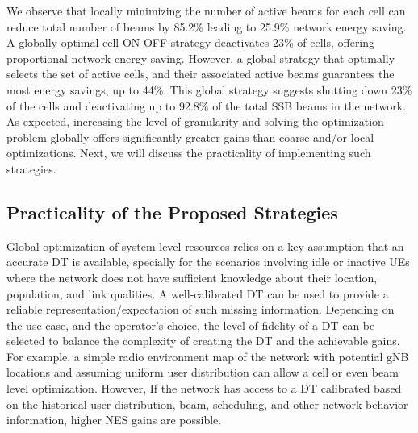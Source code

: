 We observe that locally minimizing the number of active beams for each cell can reduce total number of beams by 85.2\% %
leading to 25.9\% network energy saving.
A globally optimal cell ON-OFF strategy deactivates 23\% of cells, offering proportional network energy saving. 
However, a global strategy that optimally selects the set of active cells, and their associated active beams guarantees the most energy savings, up to 44\%. This global strategy suggests
shutting down 23\% of the cells and deactivating up to 92.8\% of the total SSB beams in the network.
As expected, increasing the level of granularity and solving the optimization problem globally offers significantly greater gains than coarse and/or local optimizations. Next, we will discuss the practicality of implementing such strategies. 


\subsection{Practicality of the Proposed Strategies}
Global optimization of system-level resources relies on a key assumption that an accurate DT is available, specially for the scenarios involving idle or inactive UEs where the network does not have sufficient knowledge about their location, population, and link qualities. A well-calibrated DT can be used to provide a reliable representation/expectation of such missing information.  
Depending on the use-case, and the operator's choice, the level of fidelity of a DT can be selected to balance the complexity of creating the DT and the achievable gains. 
For example, a simple radio environment map of the network with potential gNB locations and assuming uniform user distribution can allow a cell or even beam level optimization. However, If the network has access to a DT calibrated based on the historical user distribution, beam, scheduling, and other network behavior information, higher NES gains are possible.


